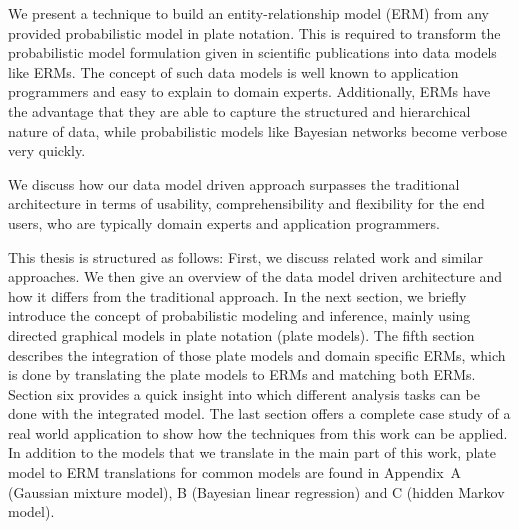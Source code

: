 We present a technique to build an entity-relationship model (ERM) from any provided probabilistic model in plate notation. This is required to transform the probabilistic model formulation given in scientific publications into data models like ERMs. The concept of such data models is well known to application programmers and easy to explain to domain experts. Additionally, ERMs have the advantage that they are able to capture the structured and hierarchical nature of data, while probabilistic models like Bayesian networks become verbose very quickly.

We discuss how our data model driven approach surpasses the traditional architecture in terms of usability, comprehensibility and flexibility for the end users, who are typically domain experts and application programmers.

This thesis is structured as follows: First, we discuss related work and similar approaches. We then give an overview of the data model driven architecture and how it differs from the traditional approach. In the next section, we briefly introduce the concept of probabilistic modeling and inference, mainly using directed graphical models in plate notation (plate models). The fifth section describes the integration of those plate models and domain specific ERMs, which is done by translating the plate models to ERMs and matching both ERMs. Section six provides a quick insight into which different analysis tasks can be done with the integrated model. The last section offers a complete case study of a real world application to show how the techniques from this work can be applied. In addition to the models that we translate in the main part of this work, plate model to ERM translations for common models are found in Appendix~A (Gaussian mixture model), B (Bayesian linear regression) and C (hidden Markov model).
